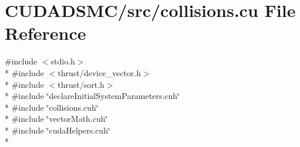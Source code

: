 \hypertarget{collisions_8cu}{\section{C\+U\+D\+A\+D\+S\+M\+C/src/collisions.cu File Reference}
\label{collisions_8cu}
}
{\ttfamily \#include $<$stdio.\+h$>$}\\*
{\ttfamily \#include $<$thrust/device\+\_\+vector.\+h$>$}\\*
{\ttfamily \#include $<$thrust/sort.\+h$>$}\\*
{\ttfamily \#include \char`\"{}declare\+Initial\+System\+Parameters.\+cuh\char`\"{}}\\*
{\ttfamily \#include \char`\"{}collisions.\+cuh\char`\"{}}\\*
{\ttfamily \#include \char`\"{}vector\+Math.\+cuh\char`\"{}}\\*
{\ttfamily \#include \char`\"{}cuda\+Helpers.\+cuh\char`\"{}}\\*
